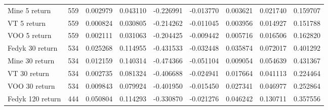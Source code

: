 \begin{appendices}
\begin{table}[ht]
\begin{adjustbox}{width=\textwidth}
\begin{tabular}{@{}lllllllll@{}}
    Mine 5 return        & 559                                & 0.002979                          & 0.043110                         & -0.226991                        & -0.013770                         & 0.003621                          & 0.021740                          & 0.159707                         \\
    VT 5 return               & 559                               & 0.000824                           & 0.030805                         & -0.214262                        & -0.011045                         & 0.003956                          & 0.014927                          & 0.151788                         \\
    VOO 5 return              & 559                               & 0.002111                           & 0.031063                         & -0.204425                        & -0.009442                         & 0.005716                          & 0.016506                          & 0.162820                         \\
    Fedyk 30 return      & 534                                & 0.025268                          & 0.114955                         & -0.431533                        & -0.032448                         & 0.035874                          & 0.072017                          & 0.401292                         \\
    Mine 30 return       & 534                                & 0.012159                          & 0.140314                         & -0.474366                        & -0.051104                         & 0.009054                          & 0.054639                          & 0.431367                         \\
    VT 30 return              & 534                               & 0.002735                           & 0.081324                         & -0.406688                        & -0.024941                         & 0.017664                          & 0.041113                          & 0.224464                         \\
    VOO 30 return             & 534                               & 0.009843                           & 0.079924                         & -0.401950                        & -0.015450                         & 0.027341                          & 0.046977                          & 0.252864                         \\
    Fedyk 120 return     & 444                                & 0.050804                          & 0.114293                         & -0.330870                        & -0.021276                         & 0.046242                          & 0.130711                          & 0.357556                         \\

\end{tabular}
\end{adjustbox}
\end{table}
\end{appendices}
